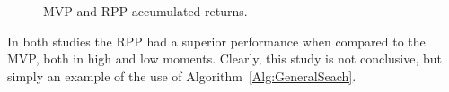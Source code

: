 



\begin{figure}[H]
	\begin{subfigmatrix}{2}
	\end{subfigmatrix}
	\caption{MVP and RPP accumulated returns.}
\end{figure}


\begin{table}[!htb]
	\centering
	\fontsize{8}{8}
	\selectfont
	\begin{minipage}{.48\linewidth}
		
	\end{minipage}%
	\begin{minipage}{.48\linewidth}
		
	\end{minipage}
	\label{tab:volHighLow12}
\end{table}


 In both studies the RPP had a superior performance when compared to the MVP, both in high and low moments. Clearly, this study is not conclusive, but simply an example of the use of Algorithm~\ref{Alg:GeneralSeach}.

